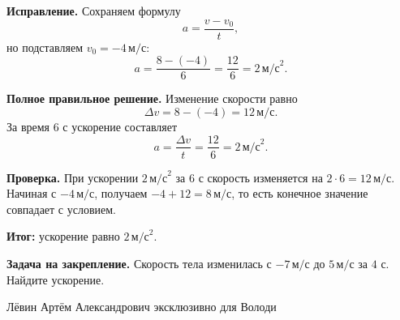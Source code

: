 \documentclass[12pt,a4paper]{article}
\newcommand{\field}[1]{\textbf{#1}}
\begin{document}
\field{Исправление.} Сохраняем формулу
\[
a=\frac{v-v_0}{t},
\]
но подставляем $v_0=-4\,\text{м/с}$:
\[
a=\frac{8-(-4)}{6}=\frac{12}{6}=2\,\text{м/с}^2.
\]

\field{Полное правильное решение.} Изменение скорости равно
\[
\Delta v=8-(-4)=12\,\text{м/с}.
\]
За время $6$ с ускорение составляет
\[
a=\frac{\Delta v}{t}=\frac{12}{6}=2\,\text{м/с}^2.
\]

\field{Проверка.} При ускорении $2\,\text{м/с}^2$ за $6$ с скорость изменяется на $2\cdot6=12\,\text{м/с}$. Начиная с $-4\,\text{м/с}$, получаем $-4+12=8\,\text{м/с}$, то есть конечное значение совпадает с условием.

\textcolor{teal!60!black}{\textbf{Итог:}} ускорение равно $2\,\text{м/с}^2$.

\field{Задача на закрепление.} Скорость тела изменилась с $-7\,\text{м/с}$ до $5\,\text{м/с}$ за $4$ с. Найдите ускорение.

\vfill
\begin{center}
\small Лёвин Артём Александрович эксклюзивно для Володи
\end{center}
\end{document}
